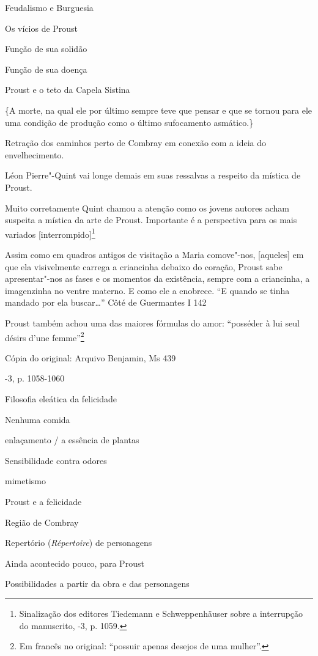 Feudalismo e Burguesia

Os vícios de Proust

Função de sua solidão

Função de sua doença

Proust e o teto da Capela Sistina

\{A morte, na qual ele por último sempre teve que pensar e que se tornou
para ele uma condição de produção como o último sufocamento asmático.\}

Retração dos caminhos perto de Combray em conexão com a ideia do
envelhecimento.

Léon Pierre"-Quint vai longe demais em suas ressalvas a respeito da
mística de Proust.

Muito corretamente Quint chamou a atenção como os jovens autores acham
suspeita a mística da arte de Proust. Importante é a perspectiva para os
mais variados {[}interrompido{]}\footnote{Sinalização dos editores
  Tiedemann e Schweppenhäuser sobre a interrupção do manuscrito,
  -3, p. 1059. \versal{[N. T.]}}

Assim como em quadros antigos de visitação a Maria comove"-nos,
{[}aqueles{]} em que ela visivelmente carrega a criancinha debaixo do
coração, Proust sabe apresentar"-nos as fases e os momentos da
existência, sempre com a criancinha, a imagenzinha no ventre materno. E
como ele a enobrece. ``E quando se tinha mandado por ela buscar\ldots{}''
Côté de Guermantes I 142

Proust também achou uma das maiores fórmulas do amor: ``posséder à lui
seul désirs d'une femme''\footnote{Em francês no original:
  ``possuir apenas desejos de uma mulher''. \versal{[N. T.]}}

Cópia do original: Arquivo Benjamin, Ms 439

-3, p. 1058-1060

Filosofia eleática da felicidade

Nenhuma comida

enlaçamento / a essência de plantas

Sensibilidade contra odores

mimetismo

Proust e a felicidade

Região de Combray

Repertório (\emph{Répertoire}) de personagens

Ainda acontecido pouco, para Proust

Possibilidades a partir da obra e das personagens

